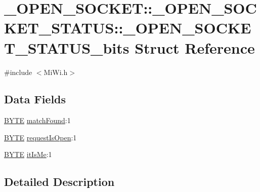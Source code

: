 \hypertarget{struct___o_p_e_n___s_o_c_k_e_t_1_1___o_p_e_n___s_o_c_k_e_t___s_t_a_t_u_s_1_1___o_p_e_n___s_o_c_k_e_t___s_t_a_t_u_s__bits}{}\section{\+\_\+\+O\+P\+E\+N\+\_\+\+S\+O\+C\+K\+E\+T\+:\+:\+\_\+\+O\+P\+E\+N\+\_\+\+S\+O\+C\+K\+E\+T\+\_\+\+S\+T\+A\+T\+U\+S\+:\+:\+\_\+\+O\+P\+E\+N\+\_\+\+S\+O\+C\+K\+E\+T\+\_\+\+S\+T\+A\+T\+U\+S\+\_\+bits Struct Reference}
\label{struct___o_p_e_n___s_o_c_k_e_t_1_1___o_p_e_n___s_o_c_k_e_t___s_t_a_t_u_s_1_1___o_p_e_n___s_o_c_k_e_t___s_t_a_t_u_s__bits}


{\ttfamily \#include $<$Mi\+Wi.\+h$>$}

\subsection*{Data Fields}
\begin{DoxyCompactItemize}
\item 
\hyperlink{_generic_type_defs_8h_a4ae1dab0fb4b072a66584546209e7d58}{B\+Y\+T\+E} \hyperlink{struct___o_p_e_n___s_o_c_k_e_t_1_1___o_p_e_n___s_o_c_k_e_t___s_t_a_t_u_s_1_1___o_p_e_n___s_o_c_k_e_t___s_t_a_t_u_s__bits_a51f218a3fd7a39aeec80c8683259f988}{match\+Found}\+:1
\item 
\hyperlink{_generic_type_defs_8h_a4ae1dab0fb4b072a66584546209e7d58}{B\+Y\+T\+E} \hyperlink{struct___o_p_e_n___s_o_c_k_e_t_1_1___o_p_e_n___s_o_c_k_e_t___s_t_a_t_u_s_1_1___o_p_e_n___s_o_c_k_e_t___s_t_a_t_u_s__bits_a74aa4b7a8e475e65cee9f6c0f4e8193d}{request\+Is\+Open}\+:1
\item 
\hyperlink{_generic_type_defs_8h_a4ae1dab0fb4b072a66584546209e7d58}{B\+Y\+T\+E} \hyperlink{struct___o_p_e_n___s_o_c_k_e_t_1_1___o_p_e_n___s_o_c_k_e_t___s_t_a_t_u_s_1_1___o_p_e_n___s_o_c_k_e_t___s_t_a_t_u_s__bits_a29261e8dde4be2243a22b5d769ebfe79}{it\+Is\+Me}\+:1
\end{DoxyCompactItemize}


\subsection{Detailed Description}



